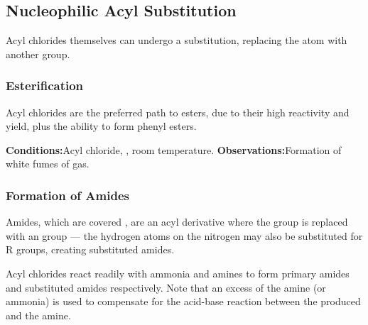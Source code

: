 


		\subsection{Nucleophilic Acyl Substitution}

			Acyl chlorides themselves can undergo a substitution, replacing the \ch{\chlorine} atom with another group.

			\subsubsection{Esterification}

				Acyl chlorides are the preferred path to esters, due to their high reactivity and yield, plus the ability to form
				phenyl esters.

				\vspace{1.5em}
				\vbox{\textbf{Conditions:}\tabto{35mm}Acyl chloride, , room temperature.}
				\vbox{\textbf{Observations:}\tabto{35mm}Formation of white fumes of  gas.}





			\pagebreak
			\hypertarget{AcylChloridesReactionWithAmines}{}
			\subsubsection{Formation of Amides}

				Amides, which are covered \hyperlink{ChapterAmides}{}, are an acyl derivative where the  group
				is replaced with an  group --- the hydrogen atoms on the nitrogen may also be substituted for R groups, creating
				substituted amides.

				Acyl chlorides react readily with ammonia and amines to form primary amides and substituted amides respectively. Note that an
				excess of the amine (or ammonia) is used to compensate for the acid-base reaction between the  produced and the
				amine.

